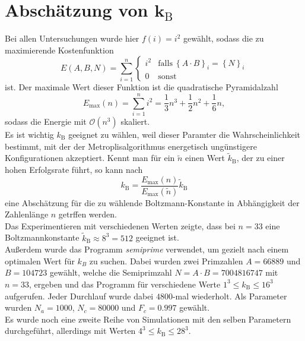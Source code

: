 \section{\texorpdfstring{Abschätzung von $\bm{k_\mathrm{B}}$}{Abschätzung von kB}}\label{sec:kbguess}
Bei allen Untersuchungen wurde hier $f\left(i\right)=i^2$ gewählt, sodass die zu maximierende Kostenfunktion
\begin{equation*}
		E\left(A,B,N\right)=\sum\limits_{i=1}^n\begin{cases}
    i^2 & \mathrm{falls}\:{\left\{A\cdot B\right\}}_i={\left\{N\right\}}_i \\
	0 & \mathrm{sonst}
  \end{cases}
\end{equation*}
ist. Der maximale Wert dieser Funktion ist die quadratische Pyramidalzahl~\parencite{oeis}
\begin{equation*}
		E_{\mathrm{\max}}\left(n\right)=\sum\limits_{i=1}^n i^2=\frac{1}{3}n^3+\frac{1}{2}n^2+\frac{1}{6}n,\label{eq:kbguess}
\end{equation*}
sodass die Energie mit $\mathcal{O}\left(n^3\right)$ skaliert. \\
Es ist wichtig $k_\mathrm{B}$ geeignet zu wählen, weil dieser Paramter die Wahrscheinlichkeit bestimmt, mit der der Metroplisalgorithmus energetisch ungünstigere Konfigurationen akzeptiert. Kennt man für ein $\tilde{n}$ einen Wert $\tilde{k}_\mathrm{B}$, der zu einer hohen Erfolgsrate  führt, so kann nach
\begin{equation*}
		k_\mathrm{B}=\frac{E_{\mathrm{\max}}\left(n\right)}{E_{\mathrm{\max}}\left(\tilde{n}\right)}\tilde{k}_\mathrm{B}
\end{equation*}
eine Abschätzung für die zu wählende Boltzmann-Konstante in Abhängigkeit der Zahlenlänge $n$ getrffen werden. \\
Das Experimentieren mit verschiedenen Werten zeigte, dass bei $n=33$ eine Boltzmannkonstante $\tilde{k}_\mathrm{B}\approx 8^3=512$ geeignet ist. \\
Außerdem wurde das Programm \textit{semiprime} verwendet, um gezielt nach einem optimalen Wert für $k_B$ zu suchen. Dabei wurden zwei Primzahlen $A=66889$ und $B=104723$ gewählt, welche die Semiprimzahl $N=A\cdot B=7004816747$ mit $n=33$, ergeben und das Programm für verschiedene Werte $1^3\leq k_\mathrm{B}\leq 16^3$ aufgerufen. Jeder Durchlauf wurde dabei $4800$-mal wiederholt. Als Parameter wurden $N_a=1000$, $N_c=80000$ und $F_c=0.997$ gewählt. \\
Es wurde noch eine zweite Reihe von Simulationen mit den selben Parametern durchgeführt, allerdings mit Werten $4^3\leq k_\mathrm{B} \leq 28^3$.
